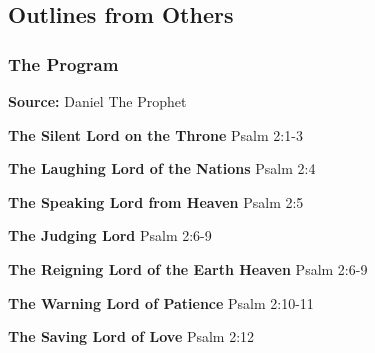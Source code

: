 \subsection{Outlines from Others}

\subsubsection{The Program}
\textbf{Source: } Daniel The Prophet\cite{dehaan1995daniel}
\begin{compactenum}[I.][19]
    \item \textbf{The Silent Lord on the Throne}  Psalm 2:1-3
    \item \textbf{The Laughing Lord of the Nations}  Psalm 2:4
    \item \textbf{The Speaking Lord from Heaven}  Psalm 2:5
    \item \textbf{The Judging Lord}  Psalm 2:6-9
    \item \textbf{The Reigning Lord of the Earth Heaven}  Psalm 2:6-9
    \item \textbf{The Warning Lord of Patience}  Psalm 2:10-11
    \item \textbf{The Saving Lord of Love}  Psalm 2:12
 \end{compactenum}



